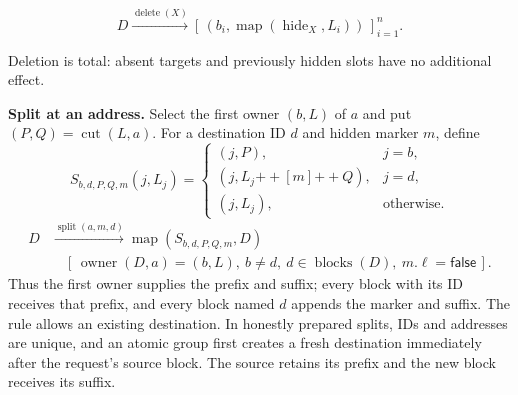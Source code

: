 \[
D\xrightarrow{\operatorname{delete}(X)}
[\,(b_i,\operatorname{map}(\operatorname{hide}_X,L_i))\,]_{i=1}^{n}.
\]

Deletion is total: absent targets and previously hidden slots have no additional effect.

\textbf{Split at an address.} Select the first owner $(b,L)$ of $a$ and
put $(P,Q)=\operatorname{cut}(L,a)$. For a destination ID $d$ and hidden
marker $m$, define
\[
S_{b,d,P,Q,m}(j,L_j)=\begin{cases}
(j,P),&j=b,\\
(j,L_j\mathbin{+\!+}[m]\mathbin{+\!+}Q),&j=d,\\
(j,L_j),&\text{otherwise}.
\end{cases}
\]
\[
\begin{aligned}
D&\xrightarrow{\operatorname{split}(a,m,d)}
 \operatorname{map}(S_{b,d,P,Q,m},D)\\
&\quad[\,\operatorname{owner}(D,a)=(b,L),\ b\ne d,\
 d\in\operatorname{blocks}(D),\ m.\ell=\mathsf{false}\,].
\end{aligned}
\]
Thus the first owner supplies the prefix and suffix; every block with its
ID receives that prefix, and every block named $d$ appends the marker and
suffix. The rule allows an existing destination. In honestly prepared
splits, IDs and addresses are unique, and an atomic group first creates a
fresh destination immediately after the request's source block. The source
retains its prefix and the new block receives its suffix.

